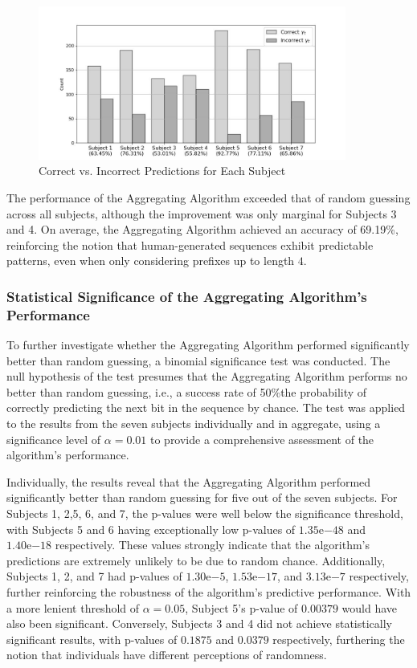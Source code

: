 \begin{figure}[h]
    \centering
    \includegraphics[width=0.9\textwidth]{images/prediction_results.jpg}
    \caption{Correct vs. Incorrect Predictions for Each Subject}\label{prediction_results}
\end{figure}

The performance of the Aggregating Algorithm exceeded that of random guessing across all subjects, although the improvement was only marginal for Subjects 3 and 4. On average, the Aggregating Algorithm achieved an accuracy of 69.19\%, reinforcing the notion that human-generated sequences exhibit predictable patterns, even when only considering prefixes up to length $4$.

\subsubsection{Statistical Significance of the Aggregating Algorithm's Performance}
To further investigate whether the Aggregating Algorithm performed significantly better than random guessing, a binomial significance test was conducted. The null hypothesis of the test presumes that the Aggregating Algorithm performs no better than random guessing, i.e., a success rate of 50\%\textemdash{}the probability of correctly predicting the next bit in the sequence by chance. The test was applied to the results from the seven subjects individually and in aggregate, using a significance level of $\alpha = 0.01$ to provide a comprehensive assessment of the algorithm's performance.

Individually, the results reveal that the Aggregating Algorithm performed significantly better than random guessing for five out of the seven subjects.  For Subjects 1, 2,5, 6, and 7, the p-values were well below the significance threshold, with Subjects 5 and 6 having exceptionally low p-values of $1.35\mathrm{e}{-48}$ and $1.40\mathrm{e}{-18}$ respectively. These values strongly indicate that the algorithm's predictions are extremely unlikely to be due to random chance. Additionally, Subjects 1, 2, and 7 had p-values of $1.30\mathrm{e}{-5}$, $1.53\mathrm{e}{-17}$, and $3.13\mathrm{e}{-7}$ respectively, further reinforcing the robustness of the algorithm's predictive performance. With a more lenient threshold of $\alpha = 0.05$, Subject 5's p-value of $0.00379$ would have also been significant. Conversely, Subjects 3 and 4 did not achieve statistically significant results, with p-values of $0.1875$ and $0.0379$ respectively, furthering the notion that individuals have different perceptions of randomness.

